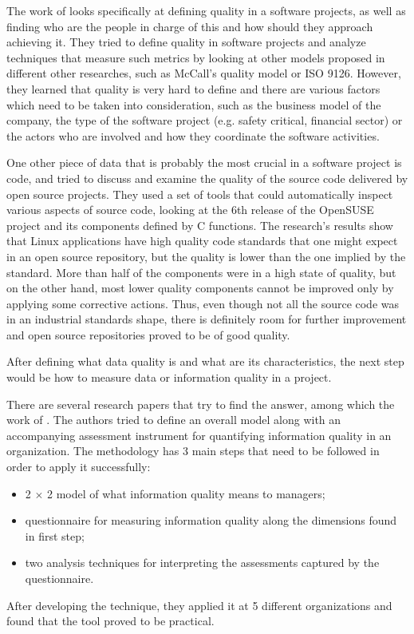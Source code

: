 \documentclass{mprop}
\begin{document}
The work of \citet{kitchenham1996software} looks specifically at defining
quality in a software projects, as well as finding who are the people in charge of 
this and how should they approach achieving it. They tried to define quality 
in software projects and analyze techniques that measure such metrics by looking
at other models proposed in different other researches, such as McCall's quality
model or ISO 9126. However, they learned that quality is very hard to define and
there are various factors which need to be taken into consideration, such as the
business model of the company, the type of the software project (e.g. safety 
critical, financial sector) or the actors who are involved and how they coordinate
the software activities.

One other piece of data that is probably the most crucial in a software project
is code, and \citet{stamelos2002code} tried to discuss and examine the quality
of the source code delivered by open source projects. They used a set of tools
that could automatically inspect various aspects of source code, looking at
the 6th release of the OpenSUSE project and its components defined by C
functions. The research's results show that Linux applications have high quality 
code standards that one might expect in an open source repository, but 
the quality is lower than the one implied by the standard. More than half
of the components were in a high state of quality, but on the other hand, 
most lower quality components cannot be improved only by applying some
corrective actions. Thus, even though not all the source code was in 
an industrial standards shape, there is definitely room for further 
improvement and open source repositories proved to be of good quality.

After defining what data quality is and what are its characteristics, the next 
step would be how to measure data or information quality in a project. 

There are several research papers that try to find the answer, among which the 
work of \citet{lee2002aimq}. The authors tried to define an overall model along 
with an accompanying assessment instrument for quantifying information quality 
in an organization. The methodology has 3 main steps that need to be followed 
in order to apply it successfully:
  \begin{itemize}
    \item 2 $\times$ 2 model of what information quality means to managers;
    \item questionnaire for measuring information quality along the dimensions
    found in first step;
    \item two analysis techniques for interpreting the assessments captured 
    by the questionnaire.
  \end{itemize} 
After developing the technique, they applied it at 5 different organizations and
found that the tool proved to be practical.
\end{document}
